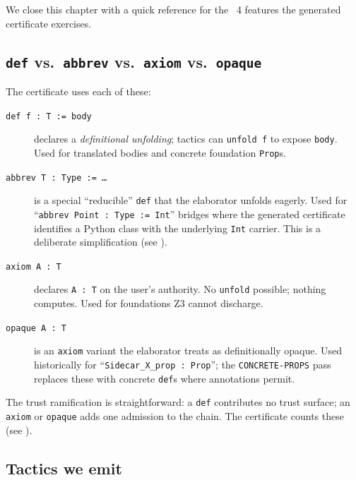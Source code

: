 We close this chapter with a quick reference for the \Lean~4
features the generated certificate exercises.

\subsection{\texttt{def} vs.\ \texttt{abbrev} vs.\ \texttt{axiom} vs.\ \texttt{opaque}}

The certificate uses each of these:
\begin{description}
  \item[\texttt{def f : T := body}] declares a \emph{definitional
  unfolding}; tactics can \texttt{unfold f} to expose \texttt{body}.
  Used for translated bodies and concrete foundation \texttt{Prop}s.

  \item[\texttt{abbrev T : Type := \dots}] is a special
  ``reducible'' \texttt{def} that the elaborator unfolds eagerly.
  Used for ``\texttt{abbrev Point : Type := Int}'' bridges where the
  generated certificate identifies a Python class with the underlying
  \texttt{Int} carrier.  This is a deliberate simplification (see
  ).

  \item[\texttt{axiom A : T}] declares \texttt{A : T} on the user's
  authority.  No \texttt{unfold} possible; nothing computes.  Used
  for foundations Z3 cannot discharge.

  \item[\texttt{opaque A : T}] is an \texttt{axiom} variant the
  elaborator treats as definitionally opaque.  Used historically for
  ``\texttt{Sidecar\_X\_prop : Prop}''; the
  \texttt{CONCRETE-PROPS} pass replaces these with concrete
  \texttt{def}s where annotations permit.
\end{description}

The trust ramification is straightforward: a \texttt{def} contributes
no trust surface; an \texttt{axiom} or \texttt{opaque} adds one
admission to the chain.  The certificate counts these (see
).

\subsection{Tactics we emit}

